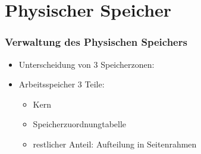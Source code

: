 \documentclass[ddcfooter,nosectionnum]{tudbeamer}
\begin{document}
\section{Physischer Speicher}
\begin{frame}
    \frametitle{Verwaltung des Physischen Speichers}   
   	  \begin{itemize}
      	\item Unterscheidung von 3 Speicherzonen: 

	  
			
			
%     
	
	\item Arbeitsspeicher 3 Teile: 
	\begin{itemize}
		\item Kern
		\item Speicherzuordnungtabelle
		\item restlicher Anteil: Aufteilung in Seitenrahmen
	\end{itemize}
	\end{itemize}
\end{frame}
\end{document}
